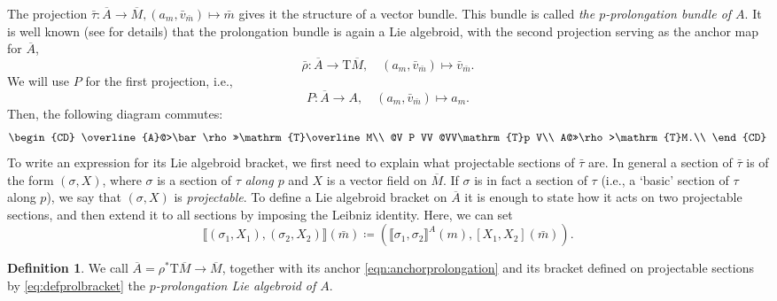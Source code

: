 \documentclass[11pt]{article}
\theoremstyle{plain}
\theoremstyle{definition}
\newtheorem{definition}{Definition}
\begin{document}
The projection $\bar\tau\colon \overline{A}\to \overline{M}, (a_m, {\bar v}_{\bar m}) \mapsto \bar m$ gives it the structure of a vector bundle. This bundle is called \emph{the $p$-prolongation bundle of $A$}. It is well known (see \cite{deleon2005survey,martinez2002prolongation} for details) that the prolongation bundle is again a Lie algebroid, with the second projection serving as the anchor map for $\overline{A}$,
\begin{equation}\label{eqn:anchorprolongation}
    \bar{\rho}\colon \overline A \longrightarrow \mathrm{T}\overline M,\quad (a_m, {\bar v}_{\bar m}) \longmapsto {\bar v}_{\bar m}.
\end{equation}
We will use $P$ for the first projection, i.e.,
\begin{equation*}
    P\colon \overline A \longrightarrow A,\quad ( a_m, {\bar v}_{\bar m}) \longmapsto  a_m.
\end{equation*}
Then, the following diagram commutes:
\begin{equation*}\label{eqn:cdtwo}
\begin{CD}
\overline{A}@>\bar\rho>>\mathrm{T}\overline M\\
@V P VV @VV\mathrm{T}p V\\
A@>>\rho>\mathrm{T}M.\\
\end{CD}
\end{equation*}
To write an expression for its Lie algebroid bracket, we first need to explain what projectable sections of $\bar{\tau}$ are. In general a section of $\bar{\tau}$ is of the form $(\sigma,X)$, where $\sigma$ is a section of $\tau$ \emph{along $p$} and $X$ is a vector field on $\overline M$. If $\sigma$ is in fact a section of $\tau$ (i.e., a `basic' section of $\tau$ along $p$), we say that $(\sigma,X)$ is \emph{projectable}. To define a Lie algebroid bracket on $\overline A$ it is enough to state how it acts on two projectable sections, and then extend it to all sections by imposing the Leibniz identity. Here, we can set
\begin{equation}\label{eq:defprolbracket}
    \llbracket(\sigma_1,X_1),(\sigma_2,X_2)\rrbracket (\bar m)\coloneqq \left(\llbracket\sigma_1,\sigma_2\rrbracket^A(m), [X_1,X_2](\bar m)\right).
\end{equation}

\begin{definition} \label{def:prol}
We call $\overline A = \rho^*\mathrm{T}\overline M\to \overline{M}$, together with its anchor \eqref{eqn:anchorprolongation} and its bracket defined on projectable sections by \eqref{eq:defprolbracket} the \emph{$p$-prolongation Lie algebroid of $A$}.
\end{definition}
\end{document}
